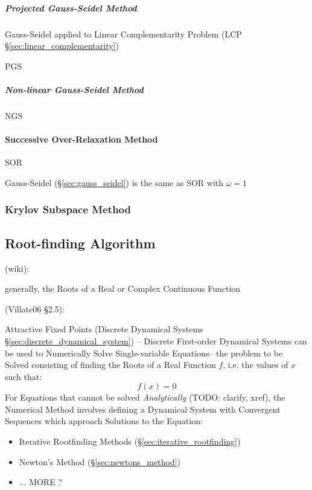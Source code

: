 \subparagraph{Projected Gauss-Seidel Method}\hfill
\label{sec:projected_gauss_seidel}

Gauss-Seidel applied to Linear Complementarity Problem (LCP
\S\ref{sec:linear_complementarity})

PGS



\subparagraph{Non-linear Gauss-Seidel Method}
\label{sec:nonlinear_gauss_seidel}

NGS



\paragraph{Successive Over-Relaxation Method}
\label{sec:successive_over_relaxation}\hfill

SOR

Gauss-Seidel (\S\ref{sec:gauss_seidel}) is the same as SOR with $\omega = 1$



\subsubsection{Krylov Subspace Method}\label{sec:krylov_subspace_method}



\subsection{Root-finding Algorithm}\label{sec:root_finding}

(wiki):

generally, the Roots of a Real or Complex Continuous Function

(Villate06 \S 2.5):

Attractive Fixed Points (Discrete Dynamical Systems
\S\ref{sec:discrete_dynamical_system}) --
Discrete First-order Dynamical Systems can be used to Numerically Solve
Single-variable Equations-- the problem to be Solved consisting of finding the
Roots of a Real Function $f$, i.e. the values of $x$ such that:
\[
  f(x) = 0
\]
For Equations that cannot be solved \emph{Analytically} (TODO: clarify, xref),
the Numerical Method involves defining a Dynamical System with Convergent
Sequences which approach Solutions to the Equation:
\begin{itemize}
  \item Iterative Rootfinding Methods (\S\ref{sec:iterative_rootfinding})
  \item Newton's Method (\S\ref{sec:newtons_method})
  \item ... MORE ?
\end{itemize}



